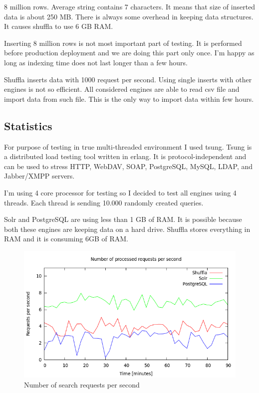 \documentclass[10pt,a4paper]{article}
\begin{document}
8 million rows. Average string contains 7 characters. It means that size of inserted data is about 250 MB. There is always some overhead in keeping data structures. It causes shuffla to use 6 GB RAM.

Inserting 8 million rows is not most important part of testing. It is performed before production deployment and we are doing this part only once. I'm happy as long as indexing time does not last longer than a few hours. 

Shuffla inserts data with 1000 request per second. Using single inserts with other engines is not so efficient. All considered engines are able to read csv file and import data from such file. This is the only way to import data within few hours.

\subsection{Statistics}

For purpose of testing in true multi-threaded environment I used tsung. Tsung is a distributed load testing tool written in erlang. It is protocol-independent and can be used to stress HTTP, WebDAV, SOAP, PostgreSQL, MySQL, LDAP, and Jabber/XMPP servers. 

I'm using 4 core processor for testing so I decided to test all engines using 4 threads. Each thread is sending 10.000 randomly created queries. 

Solr and PostgreSQL are using less than 1 GB of RAM. It is possible because both these engines are keeping data on a hard drive. Shuffla stores everything in RAM and it is consuming 6GB of RAM. 

\begin{figure}
\centering
  \includegraphics[width=12cm]{request_count_tn}
  \caption{Number of search requests per second}
  \label{fig:request_count_tn}
\end{figure}
\end{document}
